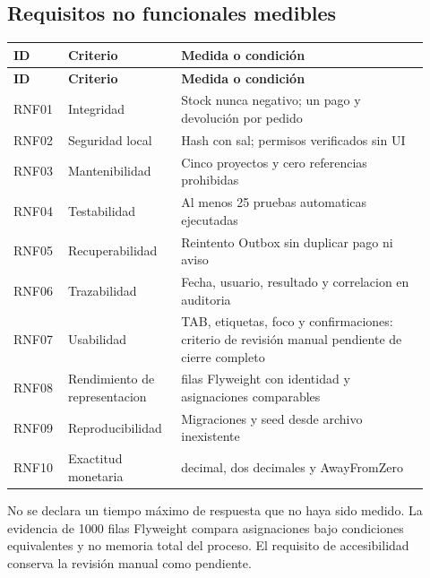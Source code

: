 \subsection{Requisitos no funcionales medibles}
\begingroup\small
\begin{longtable}{@{}>{\raggedright\arraybackslash}p{0.1\linewidth}>{\raggedright\arraybackslash}p{0.25\linewidth}>{\raggedright\arraybackslash}p{0.57\linewidth}@{}}
\toprule
\textbf{ID} & \textbf{Criterio} & \textbf{Medida o condición}\\
\midrule
\endfirsthead
\toprule
\textbf{ID} & \textbf{Criterio} & \textbf{Medida o condición}\\
\midrule
\endhead
RNF01 & Integridad & Stock nunca negativo; un pago y devolución por pedido\\[3pt]
RNF02 & Seguridad local & Hash con sal; permisos verificados sin UI\\[3pt]
RNF03 & Mantenibilidad & Cinco proyectos y cero referencias prohibidas\\[3pt]
RNF04 & Testabilidad & Al menos 25 pruebas automaticas ejecutadas\\[3pt]
RNF05 & Recuperabilidad & Reintento Outbox sin duplicar pago ni aviso\\[3pt]
RNF06 & Trazabilidad & Fecha, usuario, resultado y correlacion en auditoria\\[3pt]
RNF07 & Usabilidad & TAB, etiquetas, foco y confirmaciones: criterio de revisión manual pendiente de cierre completo\\[3pt]
RNF08 & Rendimiento de representacion & 1000 filas Flyweight con identidad y asignaciones comparables\\[3pt]
RNF09 & Reproducibilidad & Migraciones y seed desde archivo inexistente\\[3pt]
RNF10 & Exactitud monetaria & decimal, dos decimales y AwayFromZero\\[3pt]
\bottomrule
\end{longtable}
\endgroup

No se declara un tiempo máximo de respuesta que no haya sido medido. La evidencia de 1000 filas Flyweight compara asignaciones bajo condiciones equivalentes y no memoria total del proceso. El requisito de accesibilidad conserva la revisión manual como pendiente.
